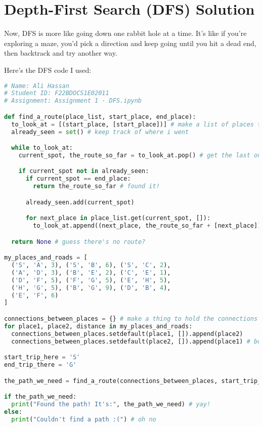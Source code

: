 \documentclass{article}
\begin{document}
\section{Depth-First Search (DFS) Solution}

Now, DFS is more like going down one rabbit hole at a time. It's like if you're exploring a maze, you'd pick a direction and keep going until you hit a dead end, then backtrack and try another way.

Here's the DFS code I used:

\begin{lstlisting}[language=Python, basicstyle=\footnotesize\ttfamily]
# Name: Ali Hassan
# Student ID: F22BDOCS1E02011
# Assignment: Assignment 1 - DFS.ipynb

def find_a_route(place_list, start_place, end_place):
  to_look_at = [(start_place, [start_place])] # make a list of places to check
  already_seen = set() # keep track of where i went

  while to_look_at:
    current_spot, the_route_so_far = to_look_at.pop() # get the last one?

    if current_spot not in already_seen:
      if current_spot == end_place:
        return the_route_so_far # found it!

      already_seen.add(current_spot)

      for next_place in place_list.get(current_spot, []):
        to_look_at.append((next_place, the_route_so_far + [next_place])) # add more to check

  return None # guess there's no route?

my_places_and_roads = [
  ('S', 'A', 3), ('S', 'B', 6), ('S', 'C', 2),
  ('A', 'D', 3), ('B', 'E', 2), ('C', 'E', 1),
  ('D', 'F', 5), ('F', 'G', 5), ('E', 'H', 5),
  ('H', 'G', 5), ('B', 'G', 9), ('D', 'B', 4),
  ('E', 'F', 6)
]

connections_between_places = {} # make a thing to hold the connections
for place1, place2, distance in my_places_and_roads:
  connections_between_places.setdefault(place1, []).append(place2)
  connections_between_places.setdefault(place2, []).append(place1) # both ways!

start_trip_here = 'S'
end_trip_there = 'G'

the_path_we_need = find_a_route(connections_between_places, start_trip_here, end_trip_there)

if the_path_we_need:
  print("Found the path! It's:", the_path_we_need) # yay!
else:
  print("Couldn't find a path :(") # oh no
\end{lstlisting}
\end{document}
